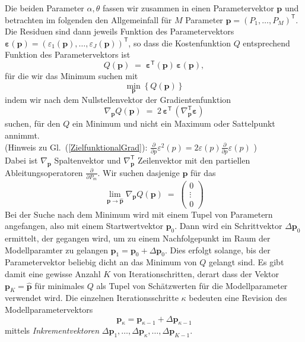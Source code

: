 Die beiden Parameter $\alpha,\theta$ fassen wir zusammen in einen Parametervektor $\mathbf{p}$ und
betrachten im folgenden den Allgemeinfall für $M$ Parameter $\mathbf{p} = (P_1,\dots,P_M)^\mathsf{T}$.
Die Residuen sind dann jeweils Funktion des Parametervektors
$\boldsymbol \varepsilon(\mathbf{p}) = (\varepsilon_1(\mathbf{p}), \dots, \varepsilon_J(\mathbf{p}))^\mathsf{T}$,
so dass die Kostenfunktion $Q$ entsprechend Funktion des Parametervektors ist
\begin{equation}
Q(\mathbf{p}) \; = \; \boldsymbol \varepsilon^\mathsf{T}(\mathbf{p}) \, \boldsymbol \varepsilon(\mathbf{p}),
\label{Zielfunktional}
\end{equation}
für die wir das Minimum suchen mit
\begin{equation}
\min_{\mathbf{p}} \left\{ Q(\mathbf{p}) \right\}
\end{equation}
indem wir nach dem Nullstellenvektor der Gradientenfunktion
\begin{equation}
\nabla_{\mathbf{p}} Q(\mathbf{p}) \; = \;
 2 \, \boldsymbol \varepsilon^\mathsf{T} \, \left( \nabla_{\mathbf{p}}^\mathsf{T} \boldsymbol \varepsilon \right)
\label{ZielfunktionalGrad}
\end{equation}
suchen, für den $Q$ ein Minimum und nicht ein Maximum oder Sattelpunkt annimmt.\\
(Hinweis zu Gl.~(\ref{ZielfunktionalGrad}): $\frac{\partial}{\partial p} \varepsilon^2(p) = 
2 \varepsilon(p) \frac{\partial}{\partial p} \varepsilon(p)$ )\\
Dabei ist $\nabla_{\mathbf{p}}$ Spaltenvektor und $\nabla_{\mathbf{p}}^\mathsf{T}$ Zeilenvektor
mit den partiellen Ableitungsoperatoren $\frac{\partial}{\partial P_m}$.
Wir suchen dasjenige $\mathbf{p}$ für das
\begin{equation}
\lim_{\mathbf{p} \rightarrow \mathbf{\hat p}}
\nabla_{\mathbf{p}} Q(\mathbf{p}) \; = \; \left(\begin{array}{c} 0\\ \vdots \\ 0 \end{array}\right)
\label{ZielfunktionalGrad1}
\end{equation}
Bei der Suche nach dem Minimum wird mit einem Tupel von Parametern angefangen, also
mit einem Startwertvektor $\mathbf{p}_0$. Dann wird ein Schrittvektor $\Delta \mathbf{p}_0$ ermittelt,
der gegangen wird, um
zu einem Nachfolgepunkt im Raum der Modellparamter zu gelangen $\mathbf{p}_1 = \mathbf{p}_0 + \Delta \mathbf{p}_0$.
Dies erfolgt solange, bis der Parametervektor beliebig dicht an das Minimum von $Q$ gelangt sind. Es gibt damit eine
gewisse Anzahl $K$ von Iterationschritten, derart dass der Vektor $\mathbf{p}_K = \mathbf{\hat p}$ für minimales
$Q$ als Tupel von Schätzwerten für die Modellparameter verwendet wird.
Die einzelnen Iterationsschritte $\kappa$ bedeuten eine Revision des Modellparametervektors
\begin{equation}
\mathbf{p}_\kappa = \mathbf{p}_{\kappa-1} + \Delta \mathbf{p}_{\kappa-1}
\label{Revisionsschritt}
\end{equation}
mittels \textsl{Inkrementvektoren}
$\Delta \mathbf{p}_1, \dots, \Delta \mathbf{p}_{\kappa}, \dots, \Delta \mathbf{p}_{K-1}$.

